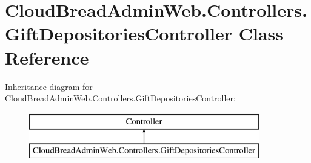 \hypertarget{a00087}{}\section{Cloud\+Bread\+Admin\+Web.\+Controllers.\+Gift\+Depositories\+Controller Class Reference}
\label{a00087}
Inheritance diagram for Cloud\+Bread\+Admin\+Web.\+Controllers.\+Gift\+Depositories\+Controller\+:\begin{figure}[H]
\begin{center}
\leavevmode
\includegraphics[height=2.000000cm]{a00087}
\end{center}
\end{figure}
